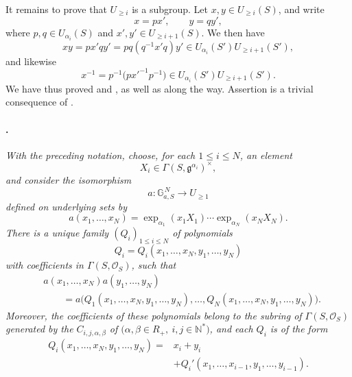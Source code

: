 It remains to prove that \(U_{\geq i}\) is a subgroup. Let
\(x,y\in U_{\geq i}(S)\), and write
\[
  x=px',\qquad y=qy',
\]
where \(p,q\in U_{\alpha_i}(S)\) and
\(x',y'\in U_{\geq i+1}(S)\). We then have
\[
  xy=px'qy'=pq(q^{-1}x'q)y'
  \in U_{\alpha_i}(S')U_{\geq i+1}(S'),
\]
and likewise
\[
  x^{-1}
  =
  p^{-1}\bigl(p{x'}^{-1}p^{-1}\bigr)
  \in U_{\alpha_i}(S')U_{\geq i+1}(S').
\]
We have thus proved \textup{} and \textup{}, as well as
\textup{} along the way. Assertion \textup{} is a trivial
consequence of .

\paragraph{.}
\textit{With the preceding notation, choose, for each
\(1\leq i\leq N\), an element}
\[
  X_i\in\Gamma(S,\mathfrak g^{\alpha_i})^\times,
\]
\textit{and consider the isomorphism}
\[
  a:\mathbb G_{a,S}^{\,N}\longrightarrow U_{\geq1}
\]
\textit{defined on underlying sets by}
\[
  a(x_1,\ldots,x_N)
  =
  \exp_{\alpha_1}(x_1X_1)\cdots
  \exp_{\alpha_N}(x_NX_N).
\]
\textit{There is a unique family \((Q_i)_{1\leq i\leq N}\) of
polynomials}
\[
  Q_i
  =
  Q_i(x_1,\ldots,x_N,y_1,\ldots,y_N)
\]
\textit{with coefficients in \(\Gamma(S,\mathcal O_S)\), such
that}
\[
\begin{split}
  &a(x_1,\ldots,x_N)a(y_1,\ldots,y_N)\\
  &\qquad =
  a\bigl(
    Q_1(x_1,\ldots,x_N,y_1,\ldots,y_N),
    \ldots,
    Q_N(x_1,\ldots,x_N,y_1,\ldots,y_N)
  \bigr).
\end{split}
\]
\textit{Moreover, the coefficients of these polynomials belong
to the subring of \(\Gamma(S,\mathcal O_S)\) generated by the
\(C_{i,j,\alpha,\beta}\) of 
\(\bigl(\alpha,\beta\in R_+,\ i,j\in\mathbb N^*\bigr)\), and
each \(Q_i\) is of the form}
\[
\begin{split}
  Q_i(x_1,\ldots,x_N,y_1,\ldots,y_N)
  ={}&x_i+y_i\\
  &+
  Q_i'(x_1,\ldots,x_{i-1},y_1,\ldots,y_{i-1}).
\end{split}
\]

